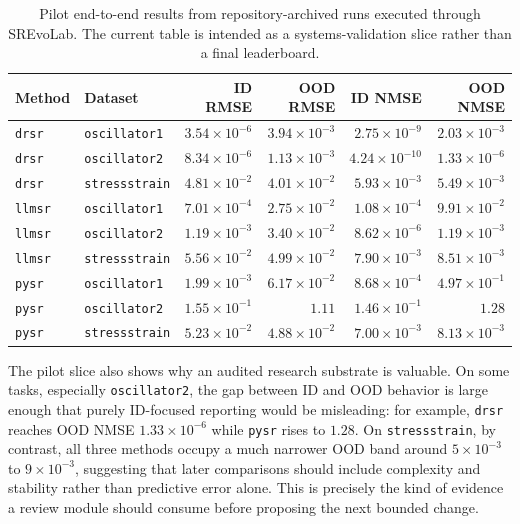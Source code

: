 \begin{table}[t]
\centering
\scriptsize
\begin{tabular}{llrrrr}
\toprule
Method & Dataset & ID RMSE & OOD RMSE & ID NMSE & OOD NMSE \\
\midrule
\texttt{drsr} & \texttt{oscillator1} & $3.54\times 10^{-6}$ & $3.94\times 10^{-3}$ & $2.75\times 10^{-9}$ & $2.03\times 10^{-3}$ \\
\texttt{drsr} & \texttt{oscillator2} & $8.34\times 10^{-6}$ & $1.13\times 10^{-3}$ & $4.24\times 10^{-10}$ & $1.33\times 10^{-6}$ \\
\texttt{drsr} & \texttt{stressstrain} & $4.81\times 10^{-2}$ & $4.01\times 10^{-2}$ & $5.93\times 10^{-3}$ & $5.49\times 10^{-3}$ \\
\texttt{llmsr} & \texttt{oscillator1} & $7.01\times 10^{-4}$ & $2.75\times 10^{-2}$ & $1.08\times 10^{-4}$ & $9.91\times 10^{-2}$ \\
\texttt{llmsr} & \texttt{oscillator2} & $1.19\times 10^{-3}$ & $3.40\times 10^{-2}$ & $8.62\times 10^{-6}$ & $1.19\times 10^{-3}$ \\
\texttt{llmsr} & \texttt{stressstrain} & $5.56\times 10^{-2}$ & $4.99\times 10^{-2}$ & $7.90\times 10^{-3}$ & $8.51\times 10^{-3}$ \\
\texttt{pysr} & \texttt{oscillator1} & $1.99\times 10^{-3}$ & $6.17\times 10^{-2}$ & $8.68\times 10^{-4}$ & $4.97\times 10^{-1}$ \\
\texttt{pysr} & \texttt{oscillator2} & $1.55\times 10^{-1}$ & $1.11$ & $1.46\times 10^{-1}$ & $1.28$ \\
\texttt{pysr} & \texttt{stressstrain} & $5.23\times 10^{-2}$ & $4.88\times 10^{-2}$ & $7.00\times 10^{-3}$ & $8.13\times 10^{-3}$ \\
\bottomrule
\end{tabular}
\caption{Pilot end-to-end results from repository-archived runs executed through SREvoLab. The current table is intended as a systems-validation slice rather than a final leaderboard.}
\label{tab:pilot-slice}
\end{table}

The pilot slice also shows why an audited research substrate is valuable. On some tasks, especially \texttt{oscillator2}, the gap between ID and OOD behavior is large enough that purely ID-focused reporting would be misleading: for example, \texttt{drsr} reaches OOD NMSE $1.33\times 10^{-6}$ while \texttt{pysr} rises to $1.28$. On \texttt{stressstrain}, by contrast, all three methods occupy a much narrower OOD band around $5\times 10^{-3}$ to $9\times 10^{-3}$, suggesting that later comparisons should include complexity and stability rather than predictive error alone. This is precisely the kind of evidence a review module should consume before proposing the next bounded change.

